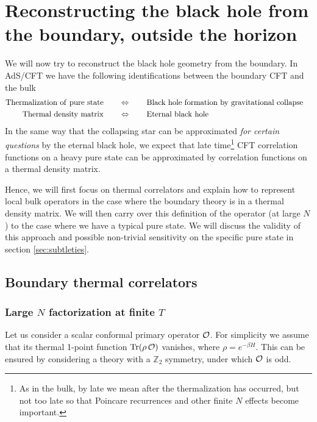 \section{Reconstructing the black hole from the boundary, outside the horizon \label{sec:outside}}

We will now try to reconstruct the black hole geometry from the boundary. 
In AdS/CFT we have the following identifications between the boundary CFT and the bulk
\[
\begin{split}
{\rm Thermalization\,\,of\,\,pure\,\,state} &\qquad\Leftrightarrow\qquad 
{\rm Black\,\, hole\,\, formation\,\, by\,\, gravitational\,\, collapse}\cr
{\rm Thermal\,\, density\,\, matrix}  & \qquad\Leftrightarrow\qquad {\rm Eternal\,\, black\,\, hole}
\end{split}
 \]
In the same way that the collapsing star can be approximated  {\it for certain questions} by the eternal black hole, we expect that late time\footnote{As in the bulk, by late we mean after the thermalization has occurred, but not too late so that Poincare recurrences and other finite $N$ effects become important.} CFT correlation functions on a heavy pure state can be approximated by correlation functions on a thermal density matrix. 

Hence, we will first focus on thermal correlators and explain how to represent local bulk operators in the case where the boundary theory is in a thermal density matrix. We will then carry over this definition of the operator (at large $N$) to the case where we have a typical pure state. We will discuss the validity of this approach and possible non-trivial sensitivity on the specific pure state in section \ref{sec:subtleties}.




\subsection{Boundary thermal correlators}


\subsubsection{Large $N$ factorization at finite $T$}
\label{factorcav}

Let us consider a scalar conformal primary operator ${\cal O}$. For simplicity we assume that its thermal 1-point function ${\rm Tr}(\rho \,{\cal O})$ vanishes,  
where $\rho = e^{-\beta H}$. This can be ensured by considering a theory with a ${\mathbb Z}_2$ symmetry, under which ${\cal O}$ is odd.


